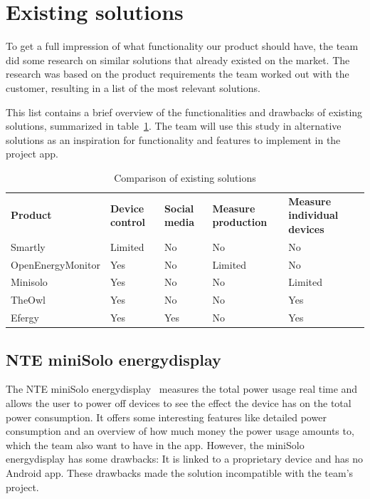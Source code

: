 \section{Existing solutions}
\label{sec:altsolution}

To get a full impression of what functionality our product should have, the team did some research on similar solutions that already existed on the market. The research was based on the product requirements the team worked out with the customer, resulting in a list of the most relevant solutions.
 
This list contains a brief overview of the functionalities and drawbacks of existing solutions, summarized in table~\ref{tab:existingSolutions}. The team will use this study in alternative solutions as an inspiration for functionality and features to implement in the project app.


\begin{table}[H]
\centering
{}
\begin{tabular}{|l|l|p{2.6cm}|p{2.3cm}|p{2.2cm}|}
\hline
\textbf{Product} & \textbf{Device control} & \textbf{Social media} & \textbf{Measure production} & \textbf{Measure individual devices} \\
Smartly & Limited & No  & No & No\\
OpenEnergyMonitor & Yes & No  & Limited & No \\
Minisolo & Yes & No  & No & Limited\\
TheOwl & Yes & No & No & Yes\\
Efergy & Yes & Yes &  No & Yes\\\hline
\end{tabular}
\caption{Comparison of existing solutions}
\label{tab:existingSolutions}
\end{table}


\subsection{NTE miniSolo energydisplay}

The NTE miniSolo energydisplay~\cite{nte} measures the total power usage real time and allows the user to power off devices to see the effect the device has on the total power consumption. It offers some interesting features like detailed power consumption and an overview of how much money the power usage amounts to, which the team also want to have in the app. However, the miniSolo energydisplay has some drawbacks: It is linked to a proprietary device and has no Android app. These drawbacks made the solution incompatible with the team's project.


